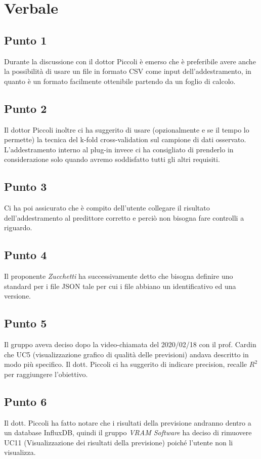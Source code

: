 \section{Verbale}
        \subsection{Punto 1}
            Durante la discussione con il dottor Piccoli è emerso che è preferibile avere anche la possibilità di usare un file in formato CSV come input dell'addestramento, in quanto è un formato facilmente ottenibile partendo da un foglio di calcolo.
        \subsection{Punto 2}
            Il dottor Piccoli inoltre ci ha suggerito di usare (opzionalmente e se il tempo lo permette) la tecnica del k-fold cross-validation sul campione di dati osservato. L'addestramento interno al plug-in invece ci ha consigliato di prenderlo in considerazione solo quando avremo soddisfatto tutti gli altri requisiti.
        \subsection{Punto 3}
            Ci ha poi assicurato che è compito dell'utente collegare il risultato dell'addestramento al predittore corretto e perciò non bisogna fare controlli a riguardo.
        \subsection{Punto 4}
            Il proponente \textit{Zucchetti} ha successivamente detto che bisogna definire uno standard per i file JSON tale per cui i file abbiano un identificativo ed una versione.
        \subsection{Punto 5}
        	Il gruppo aveva deciso dopo la video-chiamata del 2020/02/18 con il prof. Cardin che UC5 (visualizzazione grafico di qualità delle previsioni) andava descritto in modo più specifico. Il dott. Piccoli ci ha suggerito di indicare precision\glo, recall\glosp e $R^{2}$\glosp per raggiungere l'obiettivo.
        \subsection{Punto 6}
        	Il dott. Piccoli ha fatto notare che i risultati della previsione andranno dentro a un database InfluxDB, quindi il gruppo \textit{VRAM Software} ha deciso di rimuovere UC11 (Visualizzazione dei risultati della previsione) poiché l'utente non li visualizza.